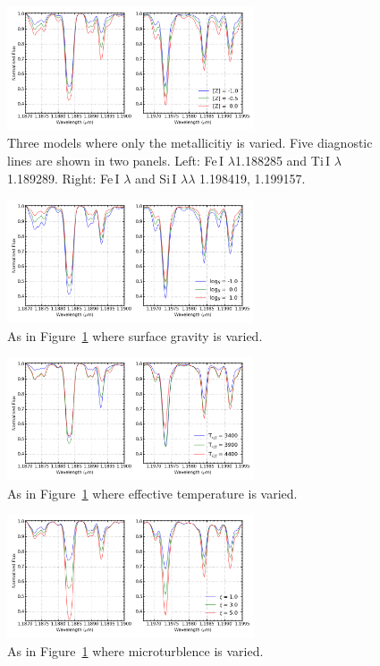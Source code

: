 \begin{figure}
 \centering
\includegraphics[width=0.65\textwidth]{JAnal/varyZv2}
\caption{
Three models where only the metallicitiy is varied.
Five diagnostic lines are shown in two panels.
Left: Fe\,I $\lambda$1.188285 and Ti\,I $\lambda$ 1.189289.
Right: Fe\,I $\lambda$ and Si\,I $\lambda\lambda$ 1.198419, 1.199157.\label{fig:mod-z}
         }
\end{figure}

\begin{figure}
 \centering
\includegraphics[width=0.65\textwidth]{JAnal/varygv2}
\caption{
As in Figure~\ref{fig:mod-z} where surface gravity is varied.\label{fig:mod-g}
         }
\end{figure}

\begin{figure}
 \centering
\includegraphics[width=0.65\textwidth]{JAnal/varyTv2}
\caption{
As in Figure~\ref{fig:mod-z} where effective temperature is varied.\label{fig:mod-t}
         }
\end{figure}

\begin{figure}
 \centering
\includegraphics[width=0.65\textwidth]{JAnal/varymicrov2}
\caption{
As in Figure~\ref{fig:mod-z} where microturblence is varied.\label{fig:mod-micro}
         }
\end{figure}

